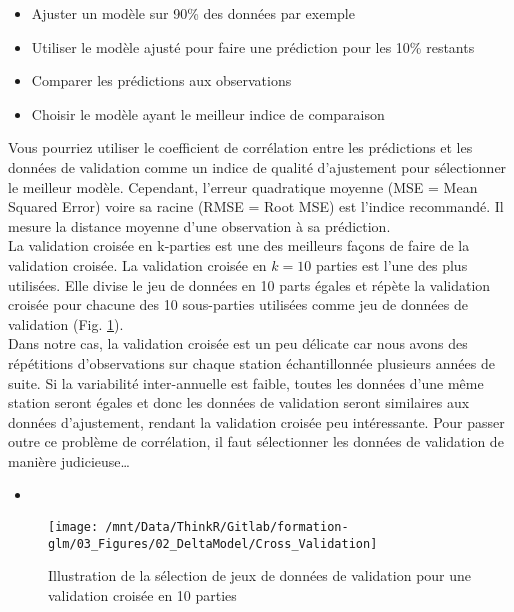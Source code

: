 \documentclass[french,a4paper]{article}
\providecommand{\tightlist}{%
  \setlength{\itemsep}{0pt}\setlength{\parskip}{0pt}}
\begin{document}
\begin{itemize}
\tightlist
\item
  Ajuster un modèle sur 90\% des données par exemple
\item
  Utiliser le modèle ajusté pour faire une prédiction pour les 10\% restants
\item
  Comparer les prédictions aux observations
\item
  Choisir le modèle ayant le meilleur indice de comparaison
\end{itemize}

Vous pourriez utiliser le coefficient de corrélation entre les prédictions et les données de validation comme un indice de qualité d'ajustement pour sélectionner le meilleur modèle. Cependant, l'erreur quadratique moyenne (MSE = Mean Squared Error) voire sa racine (RMSE = Root MSE) est l'indice recommandé. Il mesure la distance moyenne d'une observation à sa prédiction.\\
La validation croisée en k-parties est une des meilleurs façons de faire de la validation croisée. La validation croisée en \(k = 10\) parties est l'une des plus utilisées. Elle divise le jeu de données en 10 parts égales et répète la validation croisée pour chacune des 10 sous-parties utilisées comme jeu de données de validation (Fig. \ref{fig:figCrossValidationPositive}).\\
Dans notre cas, la validation croisée est un peu délicate car nous avons des répétitions d'observations sur chaque station échantillonnée plusieurs années de suite. Si la variabilité inter-annuelle est faible, toutes les données d'une même station seront égales et donc les données de validation seront similaires aux données d'ajustement, rendant la validation croisée peu intéressante.  Pour passer outre ce problème de corrélation, il faut sélectionner les données de validation de manière judicieuse\ldots{}



\begin{itemize}
\item
\end{itemize}

\begin{figure}[!h]

{\centering \texttt{[image: /mnt/Data/ThinkR/Gitlab/formation-glm/03\_Figures/02\_DeltaModel/Cross\_Validation]} 

}

\caption{Illustration de la sélection de jeux de données de validation pour une validation croisée en 10 parties}\label{fig:figCrossValidationPositive}
\end{figure}
\end{document}
